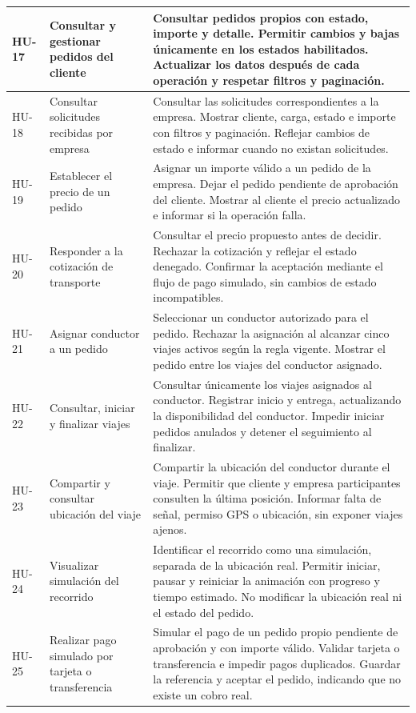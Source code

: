 \begin{longtable}{@{}>{\RaggedRight\arraybackslash}p{1.7cm}>{\RaggedRight\arraybackslash}p{3.9cm}>{\RaggedRight\arraybackslash}p{10.1cm}@{}}
		HU-17 & Consultar y gestionar pedidos del cliente & Consultar pedidos propios con estado, importe y detalle. Permitir cambios y bajas únicamente en los estados habilitados. Actualizar los datos después de cada operación y respetar filtros y paginación. \\ \midrule
		HU-18 & Consultar solicitudes recibidas por empresa & Consultar las solicitudes correspondientes a la empresa. Mostrar cliente, carga, estado e importe con filtros y paginación. Reflejar cambios de estado e informar cuando no existan solicitudes. \\ \midrule
		HU-19 & Establecer el precio de un pedido & Asignar un importe válido a un pedido de la empresa. Dejar el pedido pendiente de aprobación del cliente. Mostrar al cliente el precio actualizado e informar si la operación falla. \\ \midrule
		HU-20 & Responder a la cotización de transporte & Consultar el precio propuesto antes de decidir. Rechazar la cotización y reflejar el estado denegado. Confirmar la aceptación mediante el flujo de pago simulado, sin cambios de estado incompatibles. \\ \midrule
		HU-21 & Asignar conductor a un pedido & Seleccionar un conductor autorizado para el pedido. Rechazar la asignación al alcanzar cinco viajes activos según la regla vigente. Mostrar el pedido entre los viajes del conductor asignado. \\ \midrule
		HU-22 & Consultar, iniciar y finalizar viajes & Consultar únicamente los viajes asignados al conductor. Registrar inicio y entrega, actualizando la disponibilidad del conductor. Impedir iniciar pedidos anulados y detener el seguimiento al finalizar. \\ \midrule
		HU-23 & Compartir y consultar ubicación del viaje & Compartir la ubicación del conductor durante el viaje. Permitir que cliente y empresa participantes consulten la última posición. Informar falta de señal, permiso GPS o ubicación, sin exponer viajes ajenos. \\ \midrule
		HU-24 & Visualizar simulación del recorrido & Identificar el recorrido como una simulación, separada de la ubicación real. Permitir iniciar, pausar y reiniciar la animación con progreso y tiempo estimado. No modificar la ubicación real ni el estado del pedido. \\ \midrule
		HU-25 & Realizar pago simulado por tarjeta o transferencia & Simular el pago de un pedido propio pendiente de aprobación y con importe válido. Validar tarjeta o transferencia e impedir pagos duplicados. Guardar la referencia y aceptar el pedido, indicando que no existe un cobro real. \\ \midrule

\end{longtable}

